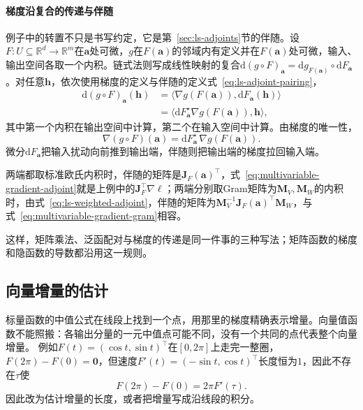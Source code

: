 \paragraph{梯度沿复合的传递与伴随}
例子中的转置不只是书写约定，它是第~\ref{sec:ls-adjoints}节的伴随。设$F:U\subseteq\mathbb R^d\to\mathbb R^m$在$\bm a$处可微，$g$在$F(\bm a)$的邻域内有定义并在$F(\bm a)$处可微，输入、输出空间各取一个内积。链式法则写成线性映射的复合$\mathrm d(g\circ F)_{\bm a}=\mathrm dg_{F(\bm a)}\circ\mathrm dF_{\bm a}$。对任意$\bm h$，依次使用梯度的定义与伴随的定义式~\eqref{eq:ls-adjoint-pairing}，
\[
 \begin{aligned}
 \mathrm d(g\circ F)_{\bm a}(\bm h)
 &=\bigl\langle\nabla g(F(\bm a)),\mathrm dF_{\bm a}(\bm h)\bigr\rangle\\
 &=\bigl\langle\mathrm dF_{\bm a}^\star\nabla g(F(\bm a)),\bm h\bigr\rangle,
 \end{aligned}
\]
其中第一个内积在输出空间中计算，第二个在输入空间中计算。由梯度的唯一性，
\begin{equation}
 \nabla(g\circ F)(\bm a)=\mathrm dF_{\bm a}^\star\,\nabla g(F(\bm a)).
\label{eq:multivariable-gradient-adjoint}
\end{equation}
微分$\mathrm dF_{\bm a}$把输入扰动向前推到输出端，伴随则把输出端的梯度拉回输入端。

两端都取标准欧氏内积时，伴随的矩阵是$\bm J_F(\bm a)^\top$，式~\eqref{eq:multivariable-gradient-adjoint}就是上例中的$\bm J_F^\top\nabla\ell$；两端分别取Gram矩阵为$\bm M_V,\bm M_W$的内积时，由式~\eqref{eq:ls-weighted-adjoint}，伴随的矩阵为$\bm M_V^{-1}\bm J_F(\bm a)^\top\bm M_W$，与式~\eqref{eq:multivariable-gradient-gram}相容。

这样，矩阵乘法、泛函配对与梯度的传递是同一件事的三种写法；矩阵函数的梯度和隐函数的导数都沿用这一规则。

\subsection{向量增量的估计}
\label{sec:multivariable-vector-increment-bound}

标量函数的中值公式在线段上找到一个点，用那里的梯度精确表示增量。向量值函数不能照搬：各输出分量的一元中值点可能不同，没有一个共同的点代表整个向量增量。
例如$F(t)=(\cos t,\sin t)^\top$在$[0,2\pi]$上走完一整圈，$F(2\pi)-F(0)=\bm 0$，但速度$F'(t)=(-\sin t,\cos t)^\top$长度恒为$1$，因此不存在$\tau$使
\[
 F(2\pi)-F(0)=2\pi F'(\tau).
\]
因此改为估计增量的长度，或者把增量写成沿线段的积分。

